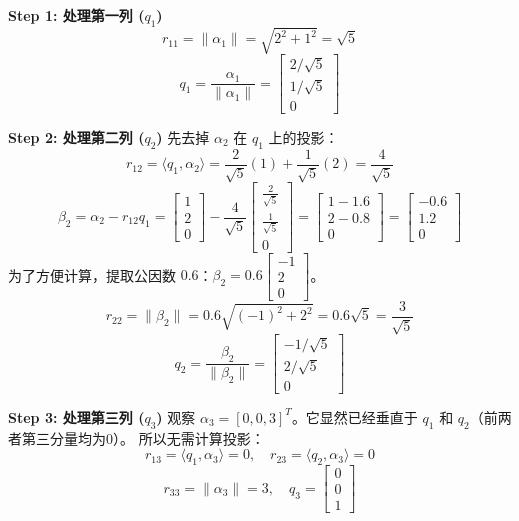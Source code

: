 \documentclass[11pt,a4paper]{ctexart}
\theoremstyle{definition}
\theoremstyle{remark}
\begin{document}
\textbf{Step 1: 处理第一列 ($q_1$)}
\[
r_{11} = \|\alpha_1\| = \sqrt{2^2 + 1^2} = \sqrt{5}
\]
\[
q_1 = \frac{\alpha_1}{\|\alpha_1\|} = \begin{bmatrix} 2/\sqrt{5} \\ 1/\sqrt{5} \\ 0 \end{bmatrix}
\]

\textbf{Step 2: 处理第二列 ($q_2$)}
先去掉 $\alpha_2$ 在 $q_1$ 上的投影：
\[
r_{12} = \langle q_1, \alpha_2 \rangle = \frac{2}{\sqrt{5}}(1) + \frac{1}{\sqrt{5}}(2) = \frac{4}{\sqrt{5}}
\]
\[
\beta_2 = \alpha_2 - r_{12}q_1 = \begin{bmatrix} 1 \\ 2 \\ 0 \end{bmatrix} - \frac{4}{\sqrt{5}} \begin{bmatrix} \frac{2}{\sqrt{5}} \\ \frac{1}{\sqrt{5}} \\ 0 \end{bmatrix}
= \begin{bmatrix} 1 - 1.6 \\ 2 - 0.8 \\ 0 \end{bmatrix} = \begin{bmatrix} -0.6 \\ 1.2 \\ 0 \end{bmatrix}
\]
为了方便计算，提取公因数 $0.6$：$\beta_2 = 0.6 \begin{bmatrix} -1 \\ 2 \\ 0 \end{bmatrix}$。
\[
r_{22} = \|\beta_2\| = 0.6 \sqrt{(-1)^2 + 2^2} = 0.6 \sqrt{5} = \frac{3}{\sqrt{5}}
\]
\[
q_2 = \frac{\beta_2}{\|\beta_2\|} = \begin{bmatrix} -1/\sqrt{5} \\ 2/\sqrt{5} \\ 0 \end{bmatrix}
\]

\textbf{Step 3: 处理第三列 ($q_3$)}
观察 $\alpha_3 = [0,0,3]^T$。它显然已经垂直于 $q_1$ 和 $q_2$（前两者第三分量均为0）。
所以无需计算投影：
\[
r_{13} = \langle q_1, \alpha_3 \rangle = 0, \quad r_{23} = \langle q_2, \alpha_3 \rangle = 0
\]
\[
r_{33} = \|\alpha_3\| = 3, \quad q_3 = \begin{bmatrix} 0 \\ 0 \\ 1 \end{bmatrix}
\]
\end{document}
